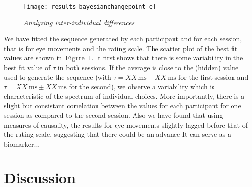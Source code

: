 \documentclass[profile,final,english, draft]{article}%
\newcommand{\ms}{\si{\milli\second}}%
\newcommand{\seeFig}[1]{Figure~\ref{fig:#1}}
\begin{document}
\begin{figure}%
\begin{center}
    \texttt{[image: results\_bayesianchangepoint\_e]}
\end{center}
\caption{\emph{Analyzing inter-individual differences}
}
\label{fig:results_inter}
\end{figure}
We have fitted the sequence generated by each participant and
for each session, that is for eye movements and the rating scale.
The scatter plot of the best fit values are shown in~\seeFig{results_inter}.
It first shows that there is some variability in the best fit value of $\tau$
in both sessions.
If the average is close to the (hidden) value used to generate the sequence
(with $\tau = XX~\ms \pm XX~\ms$ for the first session and
 $\tau = XX~\ms \pm XX~\ms$ for the second),
 we observe a variability which is characteristic of the spectrum of individual choices.
More importantly, there is a slight but consistant
correlation between the values for each participant for one session
as compared to the second session.
Also we have found that using measures of causality,
the results for eye movements slightly lagged before
that of the rating scale,
suggesting that there could be an advance
It can serve as a biomarker...


\section{Discussion}

\label{sec:outro}
\end{document}

